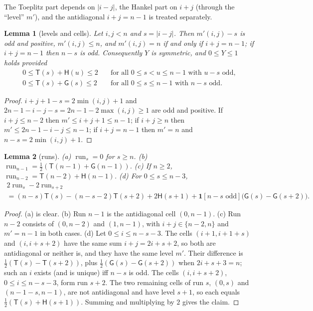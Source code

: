 \documentclass[11pt]{amsart}
\newtheorem{lemma}{Lemma}[section]
\theoremstyle{definition}
\theoremstyle{remark}
\numberwithin{equation}{section}
\newcommand{\run}{\operatorname{run}}
\newcommand{\ind}[1]{\mathbf{1}[#1]}
\newcommand{\sT}{\mathsf{T}}
\newcommand{\sH}{\mathsf{H}}
\newcommand{\sG}{\mathsf{G}}
\begin{document}
The Toeplitz part depends on $|i-j|$, the Hankel part on $i+j$ (through the ``level'' $m'$), and the
antidiagonal $i+j=n-1$ is treated separately.

\begin{lemma}[levels and cells]\label{lem:levels}
Let $i,j<n$ and $s=|i-j|$. Then $m'(i,j)-s$ is odd and positive, $m'(i,j)\le n$, and $m'(i,j)=n$ if
and only if $i+j=n-1$; if $i+j=n-1$ then $n-s$ is odd. Consequently $Y$ is symmetric, and $0\le Y\le1$
holds provided
\begin{align}
  0\le\sT(s)+\sH(u)\le2&\quad\text{for all }0\le s<u\le n-1\text{ with }u-s\text{ odd},\label{eq:cellTH}\\
  0\le\sT(s)+\sG(s)\le2&\quad\text{for all }0\le s\le n-1\text{ with }n-s\text{ odd}.\label{eq:cellTG}
\end{align}
\end{lemma}

\begin{proof}
$i+j+1-s=2\min(i,j)+1$ and $2n-1-i-j-s=2n-1-2\max(i,j)\ge1$ are odd and positive. If $i+j\le n-2$ then
$m'\le i+j+1\le n-1$; if $i+j\ge n$ then $m'\le2n-1-i-j\le n-1$; if $i+j=n-1$ then $m'=n$ and
$n-s=2\min(i,j)+1$.
\end{proof}

\begin{lemma}[runs]\label{lem:thgruns}
\textup{(a)} $\run_s=0$ for $s\ge n$. \textup{(b)} $\run_{n-1}=\frac12(\sT(n-1)+\sG(n-1))$.
\textup{(c)} If $n\ge2$, $\run_{n-2}=\sT(n-2)+\sH(n-1)$. \textup{(d)} For $0\le s\le n-3$,
\begin{multline*}
  2\run_s-2\run_{s+2}\\
  =(n-s)\sT(s)-(n-s-2)\sT(s+2)+2\sH(s+1)+\ind{n-s\text{ odd}}\bigl(\sG(s)-\sG(s+2)\bigr).
\end{multline*}
\end{lemma}

\begin{proof}
(a) is clear. (b) Run $n-1$ is the antidiagonal cell $(0,n-1)$. (c) Run $n-2$ consists of $(0,n-2)$
and $(1,n-1)$, with $i+j\in\{n-2,n\}$ and $m'=n-1$ in both cases. (d) Let $0\le i\le n-s-3$. The cells
$(i+1,i+1+s)$ and $(i,i+s+2)$ have the same sum $i+j=2i+s+2$, so both are antidiagonal or neither is, and
they have the same level $m'$. Their difference is $\frac12(\sT(s)-\sT(s+2))$, plus
$\frac12(\sG(s)-\sG(s+2))$ when $2i+s+3=n$; such an $i$ exists (and is unique) iff $n-s$ is odd. The
cells $(i,i+s+2)$, $0\le i\le n-s-3$, form run $s+2$. The two remaining cells of run $s$, $(0,s)$ and
$(n-1-s,n-1)$, are not antidiagonal and have level $s+1$, so each equals $\frac12(\sT(s)+\sH(s+1))$.
Summing and multiplying by $2$ gives the claim.
\end{proof}
\end{document}
